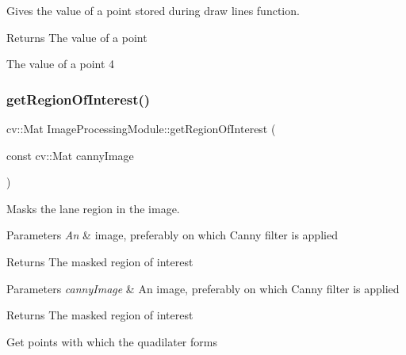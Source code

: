 Gives the value of a point stored during draw lines function. 

\begin{DoxyReturn}{Returns}
The value of a point

The value of a point 4 
\end{DoxyReturn}
\mbox{\label{class_image_processing_module_ac408874918516e4bdeab76b0a50437f7}} 
\subsubsection{\texorpdfstring{get\+Region\+Of\+Interest()}{getRegionOfInterest()}}
{\footnotesize\ttfamily cv\+::\+Mat Image\+Processing\+Module\+::get\+Region\+Of\+Interest (\begin{DoxyParamCaption}\item[{const cv\+::\+Mat}]{canny\+Image }\end{DoxyParamCaption})}



Masks the lane region in the image. 


\begin{DoxyParams}{Parameters}
{\em An} & image, preferably on which Canny filter is applied\\
\hline
\end{DoxyParams}
\begin{DoxyReturn}{Returns}
The masked region of interest
\end{DoxyReturn}

\begin{DoxyParams}{Parameters}
{\em canny\+Image} & An image, preferably on which Canny filter is applied\\
\hline
\end{DoxyParams}
\begin{DoxyReturn}{Returns}
The masked region of interest 
\end{DoxyReturn}
Get points with which the quadilater forms \mbox{\label{class_image_processing_module_a467d3e826678ec8640996da1e9c19b05}} 

